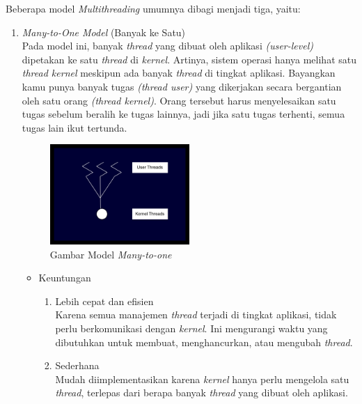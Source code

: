 \documentclass[12pt]{article}
\begin{document}
Beberapa model \textit{Multithreading} umumnya dibagi menjadi tiga, yaitu:
\begin{enumerate}
    \item \textit{Many-to-One Model} (Banyak ke Satu)\\
    Pada model ini, banyak \textit{thread} yang dibuat oleh aplikasi \textit{(user-level)} dipetakan ke satu \textit{thread} di \textit{kernel}. Artinya, sistem operasi hanya melihat satu \textit{thread kernel} meskipun ada banyak \textit{thread} di tingkat aplikasi.
    Bayangkan kamu punya banyak tugas \textit{(thread user)} yang dikerjakan secara bergantian oleh satu orang \textit{(thread kernel)}. Orang tersebut harus menyelesaikan satu tugas sebelum beralih ke tugas lainnya, jadi jika satu tugas terhenti, semua tugas lain ikut tertunda.
    \begin{figure}[h]
        \centering
        \includegraphics[width=0.5\textwidth]{asset/gambar-model-multithreading-many-to-one.jpg}
        \caption{Gambar Model \textit{Many-to-one}}
    \end{figure}
    \begin{itemize}
        \item Keuntungan \\
            \begin{enumerate}
                \item Lebih cepat dan efisien \\
                    Karena semua manajemen \textit{thread} terjadi di tingkat aplikasi, tidak perlu 
                    berkomunikasi dengan \textit{kernel}. Ini mengurangi waktu yang dibutuhkan untuk membuat, menghancurkan, atau mengubah \textit{thread}.
                \item Sederhana \\
                    Mudah diimplementasikan karena \textit{kernel} hanya perlu mengelola satu \textit{thread}, terlepas dari berapa banyak \textit{thread} yang 
                    dibuat oleh aplikasi.
            \end{enumerate}


\end{itemize}
\end{enumerate}
\end{document}
